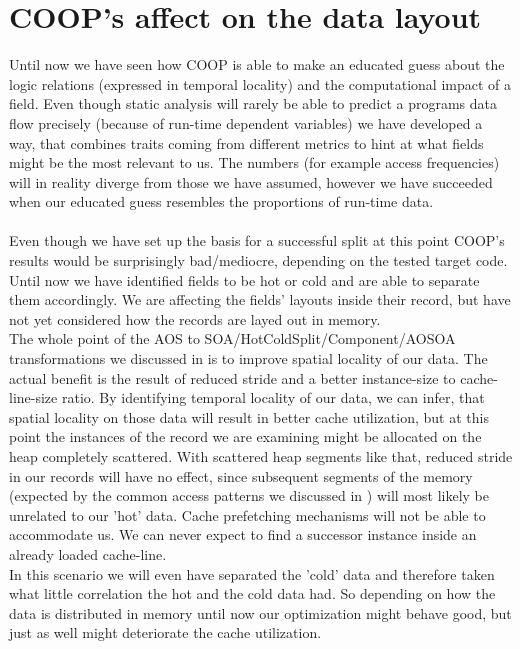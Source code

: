 \section{COOP's affect on the data layout}\label{affect_on_data_layout}
Until now we have seen how COOP is able to make an educated guess about the logic relations (expressed in temporal locality) and the computational impact of a field. Even though static analysis will rarely be able to predict a programs data flow precisely (because of run-time dependent variables) we have developed a way, that combines traits coming from different metrics to hint at what fields might be the most relevant to us. The numbers (for example access frequencies) will in reality diverge from those we have assumed, however we have succeeded when our educated guess resembles the proportions of run-time data.\\\\
Even though we have set up the basis for a successful split at this point COOP's results would be surprisingly bad/mediocre, depending on the tested target code. Until now we have identified fields to be hot or cold and are able to separate them accordingly. We are affecting the fields' layouts inside their record, but have not yet considered how the records are layed out in memory.\\
The whole point of the AOS to SOA/HotColdSplit/Component/AOSOA transformations we discussed in  is to improve spatial locality of our data. The actual benefit is the result of reduced stride and a better instance-size to cache-line-size ratio. By identifying temporal locality of our data, we can infer, that spatial locality on those data will result in better cache utilization, but at this point the instances of the record we are examining might be allocated on the heap completely scattered. With scattered heap segments like that, reduced stride in our records will have no effect, since subsequent segments of the memory (expected by the common access patterns we discussed in ) will most likely be unrelated to our 'hot' data. Cache prefetching mechanisms will not be able to accommodate us. We can never expect to find a successor instance inside an already loaded cache-line.\\ 
In this scenario we will even have separated the 'cold' data and therefore taken what little correlation the hot and the cold data had. So depending on how the data is distributed in memory until now our optimization might behave good, but just as well might deteriorate the cache utilization.\\\\
